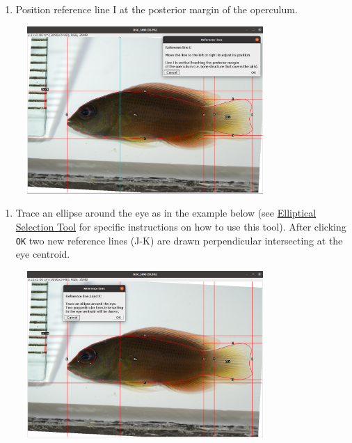 \documentclass[
  letterpaper,
  DIV=11,
  numbers=noendperiod,
  oneside]{scrreprt}
\providecommand{\tightlist}{%
  \setlength{\itemsep}{0pt}\setlength{\parskip}{0pt}}\usepackage{longtable,booktabs,array}
\begin{document}
\begin{enumerate}
\def\labelenumi{\arabic{enumi}.}
\setcounter{enumi}{6}
\tightlist
\item
  Position reference line I at the posterior margin of the operculum.
\end{enumerate}

\begin{figure}

{\centering \includegraphics[width=0.8\textwidth,height=\textheight]{./images/screenshots/ref_lineI.png}

}

\end{figure}

\begin{enumerate}
\def\labelenumi{\arabic{enumi}.}
\setcounter{enumi}{7}
\tightlist
\item
  Trace an ellipse around the eye as in the example below (see
  \href{https://imagej.nih.gov/ij/docs/guide/146-19.html}{Elliptical
  Selection Tool} for specific instructions on how to use this tool).
  After clicking \texttt{OK} two new reference lines (J-K) are drawn
  perpendicular intersecting at the eye centroid.
\end{enumerate}

\begin{figure}

{\centering \includegraphics[width=0.8\textwidth,height=\textheight]{./images/screenshots/eye_ellipse.png}

}

\end{figure}
\end{document}
